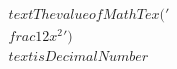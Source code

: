 \documentclass[preview]{standalone}
\begin{document}
\begin{align*}
\quad\\text{The value of } MathTex('\quad\\frac{1}{2}x^2') \quad\\text{ is } DecimalNumber
\end{align*}
\end{document}
